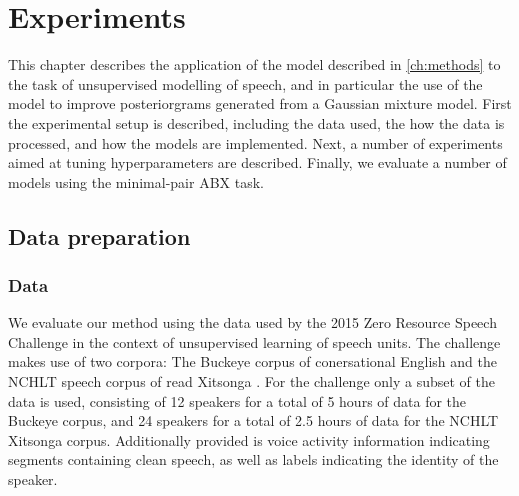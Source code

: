 %
%
%

\chapter{Experiments}
\label{ch:experiments}

This chapter describes the application of the model described in \cref{ch:methods} to the task of unsupervised modelling of speech, and in particular the use of the model to improve posteriorgrams generated from a Gaussian mixture model.
First the experimental setup is described, including the data used, the how the data is processed, and how the models are implemented.
Next, a number of experiments aimed at tuning hyperparameters are described.
Finally, we evaluate a number of models using the minimal-pair ABX task.

\section{Data preparation}
\subsection{Data}
We evaluate our method using the data used by the 2015 Zero Resource Speech Challenge in the context of unsupervised learning of speech units.
The challenge makes use of two corpora: The Buckeye corpus of conersational English \parencite{buckeyecorpus} and the NCHLT speech corpus of read Xitsonga \parencite{barnard2014nchlt}.
For the challenge only a subset of the data is used, consisting of 12 speakers for a total of 5 hours of data for the Buckeye corpus, and 24 speakers for a total of 2.5 hours of data for the NCHLT Xitsonga corpus.
Additionally provided is voice activity information indicating segments containing clean speech, as well as labels indicating the identity of the speaker.

